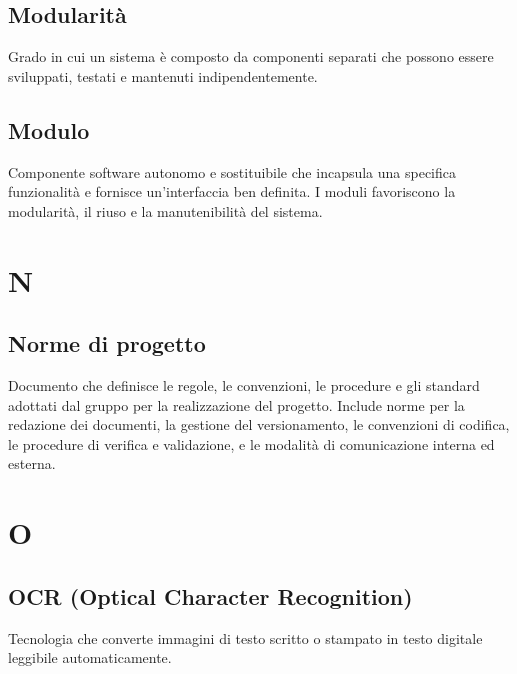 \documentclass[a4paper,11pt]{article}
\begin{document}
\subsection{Modularità}
Grado in cui un sistema è composto da componenti separati che possono essere sviluppati, testati e mantenuti indipendentemente.




\subsection{Modulo}
Componente software autonomo e sostituibile che incapsula una specifica funzionalità e fornisce un'interfaccia ben definita. I moduli favoriscono la modularità, il riuso e la manutenibilità del sistema.

\newpage









\section{N}

\subsection{Norme di progetto}
Documento che definisce le regole, le convenzioni, le procedure e gli standard adottati dal gruppo per la realizzazione del progetto. Include norme per la redazione dei documenti, la gestione del versionamento, le convenzioni di codifica, le procedure di verifica e validazione, e le modalità di comunicazione interna ed esterna.

\newpage









\section{O}

\subsection{OCR (Optical Character Recognition)}
Tecnologia che converte immagini di testo scritto o stampato in testo digitale leggibile automaticamente.
\end{document}
